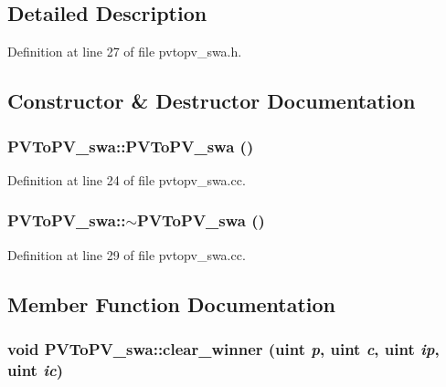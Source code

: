 \subsection{Detailed Description}


Definition at line 27 of file pvtopv\_\-swa.h.

\subsection{Constructor \& Destructor Documentation}
\subsubsection[{PVToPV\_\-swa}]{\setlength{\rightskip}{0pt plus 5cm}PVToPV\_\-swa::PVToPV\_\-swa ()}\label{classPVToPV__swa_e61260956d80cbb85fbc88cc4405cbb1}




Definition at line 24 of file pvtopv\_\-swa.cc.
\subsubsection[{$\sim$PVToPV\_\-swa}]{\setlength{\rightskip}{0pt plus 5cm}PVToPV\_\-swa::$\sim$PVToPV\_\-swa ()}\label{classPVToPV__swa_cf2004091e12ac26b24e31124337e989}




Definition at line 29 of file pvtopv\_\-swa.cc.

\subsection{Member Function Documentation}
\subsubsection[{clear\_\-winner}]{\setlength{\rightskip}{0pt plus 5cm}void PVToPV\_\-swa::clear\_\-winner ({\bf uint} {\em p}, \/  {\bf uint} {\em c}, \/  {\bf uint} {\em ip}, \/  {\bf uint} {\em ic})}\label{classPVToPV__swa_16391cc301306acef66eff1ab847c7ca}




